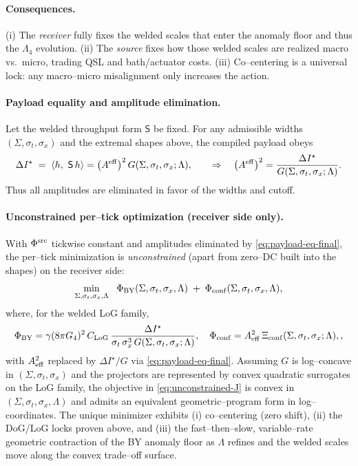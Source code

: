 \documentclass[10pt]{article}
\theoremstyle{definition}
\theoremstyle{plain}
\begin{document}
\paragraph{Consequences.}\label{par:uom-main-063}
(i) The \emph{receiver} fully fixes the welded scales that enter the anomaly floor and thus the \(\Lambda_4\) evolution. (ii) The \emph{source} fixes how those welded scales are realized macro vs.\ micro, trading QSL and bath/actuator costs. (iii) Co–centering is a universal lock: any macro–micro misalignment only increases the action.



\paragraph{Payload equality and amplitude elimination.}\label{par:uom-main-064}
Let the welded throughput form $\mathsf S$ be fixed. For any admissible widths
$(\Sigma,\sigma_t,\sigma_x)$ and the extremal shapes above, the compiled payload obeys
\begin{equation}
\label{eq:payload-eq-final}
\Delta I^\star\;=\;\langle h,\ \mathsf S\,h\rangle
=\big(A^{\rm eff}\big)^2\,G(\Sigma,\sigma_t,\sigma_x;\Lambda),
\qquad
\Rightarrow\quad
\big(A^{\rm eff}\big)^2=\frac{\Delta I^\star}{G(\Sigma,\sigma_t,\sigma_x;\Lambda)}.
\end{equation}
Thus all amplitudes are eliminated in favor of the widths and cutoff.

\paragraph{Unconstrained per–tick optimization (receiver side only).}\label{par:uom-main-065}
With $\Phi^{\rm src}$ tickwise constant and amplitudes eliminated by
\eqref{eq:payload-eq-final}, the per–tick minimization is \emph{unconstrained} (apart from
zero–DC built into the shapes) on the receiver side:
\begin{equation}
\label{eq:unconstrained-J}
\min_{\Sigma,\sigma_t,\sigma_x,\Lambda}\ \ \Phi_{\rm BY}(\Sigma,\sigma_t,\sigma_x,\Lambda)
\;+\;\Phi_{\rm conf}(\Sigma,\sigma_t,\sigma_x,\Lambda),
\end{equation}
where, for the welded LoG family,
\[
\Phi_{\rm BY}
=\gamma(8\pi G_4)^2\,C_{\rm LoG}\,\frac{\Delta I^\star}{\sigma_t\,\sigma_x^{3}\,G(\Sigma,\sigma_t,\sigma_x;\Lambda)},
\quad
\Phi_{\rm conf}=A_{\rm eff}^2\,\Xi_{\rm conf}(\Sigma,\sigma_t,\sigma_x;\Lambda),,
\]
with $A_{\rm eff}^2$ replaced by $\Delta I^\star/G$ via \eqref{eq:payload-eq-final}.
Assuming $G$ is log–concave in $(\Sigma,\sigma_t,\sigma_x)$ and the projectors are
represented by convex quadratic surrogates on the LoG family, the objective in
\eqref{eq:unconstrained-J} is convex in $(\Sigma,\sigma_t,\sigma_x,\Lambda)$ and admits
an equivalent geometric–program form in log–coordinates. The unique minimizer exhibits
(i) co–centering (zero shift), (ii) the DoG/LoG locks proven above, and (iii) the
fast–then–slow, variable–rate geometric contraction of the BY anomaly floor as $\Lambda$
refines and the welded scales move along the convex trade–off surface.
\end{document}
